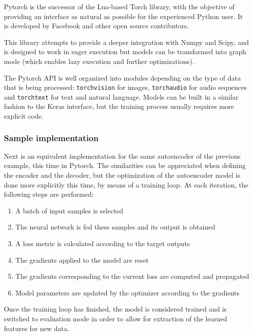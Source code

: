 Pytorch is the successor of the Lua-based Torch library, with the objective of providing an interface as natural as possible for the experienced Python user. It is developed by Facebook and other open source contributors.

This library attempts to provide a deeper integration with Numpy and Scipy, and is designed to work in eager execution but models can be transformed into graph mode (which enables lazy execution and further optimizations).

The Pytorch API is well organized into modules depending on the type of data that is being processed: \texttt{torchvision} for images, \texttt{torchaudio} for audio sequences and \texttt{torchtext} for text and natural language. Models can be built in a similar fashion to the Keras interface, but the training process usually requires more explicit code.

\subsubsection{Sample implementation}

Next is an equivalent implementation for the same autoencoder of the previous example, this time in Pytorch. The similarities can be appreciated when defining the encoder and the decoder, but the optimization of the autoencoder model is done more explicitly this time, by means of a training loop. At each iteration, the following steps are performed:

\begin{enumerate}
    \item A batch of input samples is selected
    \item The neural network is fed these samples and its output is obtained
    \item A loss metric is calculated according to the target outputs
    \item The gradients applied to the model are reset
    \item The gradients corresponding to the current loss are computed and propagated
    \item Model parameters are updated by the optimizer according to the gradients
\end{enumerate}

Once the training loop has finished, the model is considered trained and is switched to evaluation mode in order to allow for extraction of the learned features for new data.

